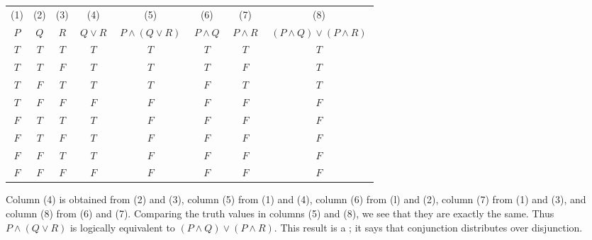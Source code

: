 \begin{exam}
 \begin{center}
  \begin{tabular}{|c|c|c||c|c|c|c|c|}\hline
       (1)  &   (2)   &   (3)   &      (4)       &       (5)                &       (6)       &      (7)        &                (8)                 \\
    \,$P$\, & \,$Q$\, & \,$R$\, & \,$Q \lor R$\, & \,$P \land (Q \lor R)$\, & \,$P \land Q$\, & \,$P \land R$\, & \,$(P \land Q) \lor (P \land R)$\, \\
    \hline\hline
      $T$   &   $T$   &   $T$   &     $T$        &       $T$                &      $T$        &      $T$        &                $T$                 \\
    \hline
      $T$   &   $T$   &   $F$   &     $T$        &       $T$                &      $T$        &      $F$        &                $T$                 \\
    \hline
      $T$   &   $F$   &   $T$   &     $T$        &       $T$                &      $F$        &      $T$        &                $T$                 \\
    \hline
      $T$   &   $F$   &   $F$   &     $F$        &       $F$                &      $F$        &      $F$        &                $F$                 \\
    \hline
      $F$   &   $T$   &   $T$   &     $T$        &       $F$                &      $F$        &      $F$        &                $F$                 \\
    \hline
      $F$   &   $T$   &   $F$   &     $T$        &       $F$                &      $F$        &      $F$        &                $F$                 \\
    \hline
      $F$   &   $F$   &   $T$   &     $T$        &       $F$                &      $F$        &      $F$        &                $F$                 \\
    \hline
      $F$   &   $F$   &   $F$   &     $F$        &       $F$                &      $F$        &      $F$        &                $F$                 \\
    \hline
  \end{tabular}
 \end{center}
Column (4) is obtained from (2) and (3), column (5) from (1) and (4), column (6) from (l) and
(2), column (7) from (1) and (3), and column (8) from (6) and (7).  Comparing the truth values
in columns (5) and (8), we see that they are exactly the same.  Thus $P \land (Q \lor R)$ is
logically equivalent to $(P \land Q) \lor (P \land R)$. This result is a
; it says that conjunction distributes over
disjunction.
\end{exam}

